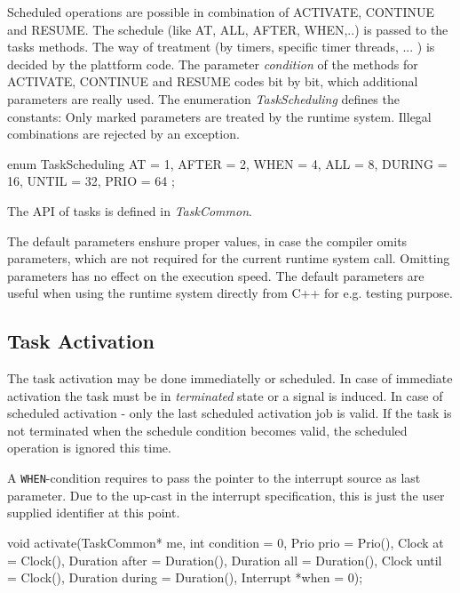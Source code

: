 Scheduled operations are possible in combination of ACTIVATE, 
CONTINUE and RESUME.
The schedule (like AT, ALL, AFTER, WHEN,..) is passed to the 
tasks methods. The way of treatment (by timers, specific timer threads, ... )
is decided by the plattform code.
The parameter {\em condition} of the methods for ACTIVATE, CONTINUE and RESUME
codes bit by bit, which additional parameters are really used.
The enumeration {\em TaskScheduling} defines the constants:
Only marked parameters are treated by the runtime system.
Illegal combinations are rejected by an exception.
\begin{CppCode}
      enum TaskScheduling {
         AT = 1, AFTER = 2, WHEN = 4, ALL = 8,
         DURING = 16, UNTIL = 32, PRIO = 64
      };
\end{CppCode}

The API of tasks is defined in {\em TaskCommon}.

The default parameters enshure proper values, in case the compiler omits 
parameters, which are not required for the current runtime system call.
Omitting parameters has no effect on the execution speed.
The default parameters are useful when using the runtime system
directly from C++ for e.g. testing purpose.

\subsection{Task Activation}
The task activation may be done immediatelly or scheduled. 
In case of immediate activation the task must be in {\em terminated} state or
a signal is induced.
In case of scheduled activation - only the last scheduled activation job is
valid. If the task is not terminated when the schedule condition becomes valid,
the scheduled operation is ignored this time.

A \verb|WHEN|-condition requires to pass the pointer to the interrupt source
as last parameter. Due to the up-cast in the interrupt specification, this
is just the user supplied identifier at this point.

\begin{CppCode}
void activate(TaskCommon* me,
              int condition = 0,
              Prio prio = Prio(),
              Clock at = Clock(),
              Duration after = Duration(),
              Duration all = Duration(),
              Clock until = Clock(),
              Duration during = Duration(),
              Interrupt *when = 0);
\end{CppCode}

